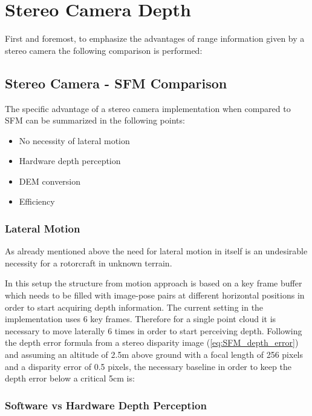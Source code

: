 \chapter{Stereo Camera Depth}
\label{chapter:stereo_camera_depth}

First and foremost, to emphasize the advantages of range information given by a stereo camera the following comparison is performed:

\section{Stereo Camera - SFM Comparison}

The specific advantage of a stereo camera implementation when compared to SFM can be summarized in the following points:

\begin{itemize}
    \item No necessity of lateral motion
    \item Hardware depth perception
    \item DEM conversion
    \item Efficiency
\end{itemize}

\subsection{Lateral Motion}

As already mentioned above the need for lateral motion in itself is an undesirable necessity for a rotorcraft in unknown terrain. 

In this setup the structure from motion approach is based on a key frame buffer which needs to be filled with image-pose pairs at different horizontal positions in order to start acquiring depth information. The current setting in the implementation \citet{SFM} uses 6 key frames. Therefore for a single point cloud it is necessary to move laterally 6 times in order to start perceiving depth. Following the depth error formula from a stereo disparity image (\ref{eq:SFM_depth_error}) and assuming an altitude of 2.5m above ground with a focal length of 256 pixels and a disparity error of 0.5 pixels, the necessary baseline in order to keep the depth error below a critical 5cm is:

\subsection{Software vs Hardware Depth Perception}

